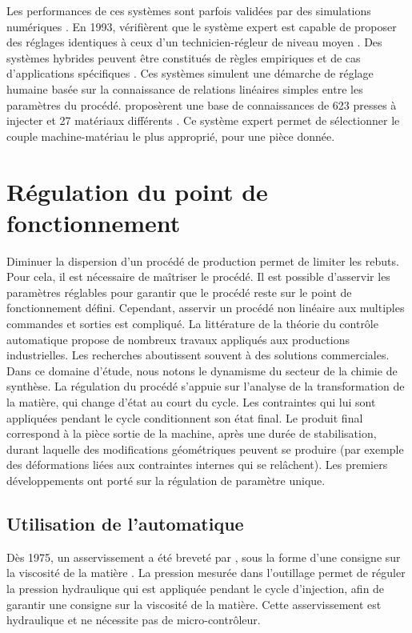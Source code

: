 Les performances de ces systèmes sont parfois validées par des simulations numériques \cite{jan_expert_1992}.
En 1993, \citeauthor{kameoka_development_1993} vérifièrent que le système expert est capable de proposer des réglages identiques à ceux d’un technicien-régleur de niveau moyen \cite{kameoka_development_1993}.
Des systèmes hybrides peuvent être constitués de règles empiriques et de cas d'applications spécifiques \cite{shelesh-nezhad_intelligent_1997}.
Ces systèmes simulent une démarche de réglage humaine basée sur la connaissance de relations linéaires simples entre les paramètres du procédé.
\citeauthor{bozdana_development_2002} proposèrent une base de connaissances de 623 presses à injecter et 27 matériaux différents \cite{bozdana_development_2002}.
Ce système expert permet de sélectionner le couple machine-matériau le plus approprié, pour une pièce donnée.

\section{Régulation du point de fonctionnement} \label{subsec:regulation}
Diminuer la dispersion d’un procédé de production permet de limiter les rebuts.
Pour cela, il est nécessaire de maîtriser le procédé.
Il est possible d’asservir les paramètres réglables pour garantir que le procédé reste sur le point de fonctionnement défini.
Cependant, asservir un procédé non linéaire aux multiples commandes et sorties est compliqué.
La littérature de la théorie du contrôle automatique propose de nombreux travaux appliqués aux productions industrielles.
Les recherches aboutissent souvent à des solutions commerciales.
Dans ce domaine d'étude, nous notons le dynamisme du secteur de la chimie de synthèse.
La régulation du procédé s'appuie sur l'analyse de la transformation de la matière, qui change d'état au court du cycle.
Les contraintes qui lui sont appliquées pendant le cycle conditionnent son état final.
Le produit final correspond à la pièce sortie de la machine, après une durée de stabilisation, durant laquelle des modifications géométriques peuvent se produire (par exemple des déformations liées aux contraintes internes qui se relâchent).
Les premiers développements ont porté sur la régulation de paramètre unique.

\subsection{Utilisation de l'automatique} \label{subsubsec:automatic}
Dès 1975, un asservissement a été breveté par \citeauthor{laczko_controller_1975}, sous la forme d'une consigne sur la viscosité de la matière \cite{laczko_controller_1975}.
La pression mesurée dans l'outillage permet de réguler la pression hydraulique qui est appliquée pendant le cycle d'injection, afin de garantir une consigne sur la viscosité de la matière.
Cette asservissement est hydraulique et ne nécessite pas de micro-contrôleur.

